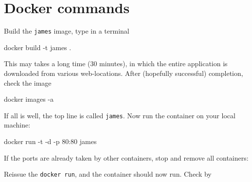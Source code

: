 \documentclass[
]{book}
\newenvironment{Shaded}{\begin{snugshade}}{\end{snugshade}}
\newcommand{\AttributeTok}[1]{\textcolor[rgb]{0.77,0.63,0.00}{#1}}
\newcommand{\ExtensionTok}[1]{#1}
\newcommand{\NormalTok}[1]{#1}
\newcommand{\VariableTok}[1]{\textcolor[rgb]{0.00,0.00,0.00}{#1}}
\begin{document}
\hypertarget{docker-commands}{%
\section{Docker commands}\label{docker-commands}}

Build the \texttt{james} image, type in a terminal

\begin{Shaded}
\begin{Highlighting}[]
\ExtensionTok{docker}\NormalTok{ build }\AttributeTok{{-}t}\NormalTok{ james .}
\end{Highlighting}
\end{Shaded}

This may takes a long time (30 minutes), in which the entire application is downloaded from various web-locations. After (hopefully successful) completion, check the image

\begin{Shaded}
\begin{Highlighting}[]
\ExtensionTok{docker}\NormalTok{ images }\AttributeTok{{-}a}
\end{Highlighting}
\end{Shaded}

If all is well, the top line is called \texttt{james}. Now run the container on your local machine:

\begin{Shaded}
\begin{Highlighting}[]
\ExtensionTok{docker}\NormalTok{ run }\AttributeTok{{-}t} \AttributeTok{{-}d} \AttributeTok{{-}p}\NormalTok{ 80:80 james}
\end{Highlighting}
\end{Shaded}

If the ports are already taken by other containers, stop and remove all containers:

\begin{Shaded}
\end{Shaded}

Reissue the \texttt{docker\ run}, and the container should now run. Check by
\end{document}
